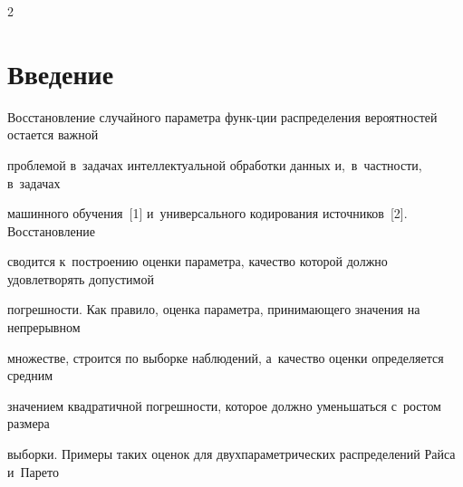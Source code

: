 

  


\vspace*{-1pt}













\thispagestyle{headings}





\begin{multicols}{2}





\label{st\stat}





\section{Введение }










Восстановление случайного параметра функ-\linebreak ции распределения вероятностей остается важ\-ной\linebreak 


проб\-ле\-мой в~задачах интеллектуальной обработки данных и,~в~част\-ности, в~задачах 


машинного обуче\-ния~[1] и~универсального кодирования источ\-ников~[2]. Восстановление 


сводится к~по\-стро\-ению оценки па\-ра\-мет\-ра, качество которой должно удовле\-тво\-рять допустимой 


погрешности. Как правило, оценка па\-ра\-мет\-ра, при\-ни\-ма\-юще\-го значения на непрерывном 


множестве, строится по выборке наблюдений, а~качество оценки определяется сред\-ним 


значением квадратичной по\-греш\-ности, которое долж\-но уменьшаться с~рос\-том размера 


выборки. Примеры таких оценок для двухпараметрических распределений Райса и~Парето 



\end{multicols}
